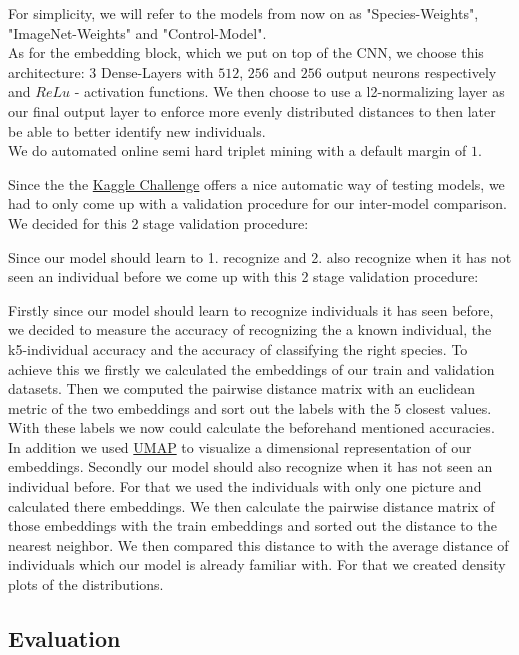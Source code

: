 \noindent For simplicity, we will refer to the models from now on as "Species-Weights", "ImageNet-Weights" and "Control-Model". \\
As for the embedding block, which we put on top of the CNN, we choose this architecture: 3 Dense-Layers with $512$, $256$ and $256$ output neurons respectively and $ReLu$ - activation functions. We then choose to use a l2-normalizing layer as our final output layer to enforce more evenly distributed distances to then later be able to better identify new individuals. \\
We do automated online semi hard triplet mining with a default margin of $1$.

\noindent Since the the \hyperref[sec:kagglechallenge]{Kaggle Challenge} offers a nice automatic way of testing models, we had to only come up with a validation procedure for our inter-model comparison. We decided for this 2 stage validation procedure:


Since our model should learn to 1. recognize  and 2. also recognize  when it has not seen an individual before we come up with this 2 stage validation procedure:


Firstly since our model should learn to recognize individuals it has seen before, we decided to measure the accuracy of recognizing the a known individual, the k5-individual accuracy and the accuracy of classifying the right species. To achieve this we firstly we calculated the embeddings of our train and validation datasets. Then we computed the pairwise distance matrix with an euclidean metric of the two embeddings and sort out the labels with the 5 closest values. With these labels we now could calculate the beforehand mentioned accuracies. In addition we used \href{https://umap-learn.readthedocs.io/en/latest/basic_usage.html}{UMAP} to visualize a dimensional representation of our embeddings. 
Secondly our model should also recognize when it has not seen an individual before. For that we used the individuals with only one picture and calculated there embeddings. We then calculate the pairwise distance matrix of those embeddings with the train embeddings and sorted out the distance to the nearest neighbor. We then compared this distance to with the average distance of individuals which our model is already familiar with. For that we created density plots of the distributions.

\subsection{Evaluation}

